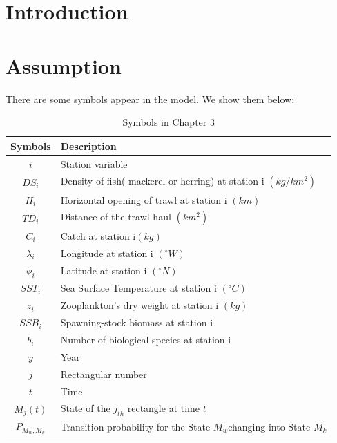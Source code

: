 \documentclass{mcmthesis}
\begin{document}
\tableofcontents


\section{Introduction}




\section{Assumption}

There are some symbols appear in the model. We show them below:
\begin{table}[htbp]
\centering
\caption{Symbols in Chapter 3}
\begin{tabular}{cp{}}
\toprule
 Symbols & Description\\
\midrule
 $i$ & Station variable \\
 $DS_i$ & Density of fish( mackerel or herring) at station i $(kg/km^2)$\\
 $H_i$ & Horizontal opening of trawl at station i  $(km)$\\
 $TD_i$ & Distance of the trawl haul $(km^2)$ \\
 $C_i$ &  Catch at station i$(kg)$\\

  $\lambda_i$ &   Longitude at station i $(^\circ W)$\\
 $\phi_i$ &   Latitude at station i $(^\circ N)$\\
$SST_i$ &  Sea Surface Temperature at station i $(^\circ C)$\\

 $z_i$ & Zooplankton's dry weight at station i $(kg)$\\
 $SSB_i$ &  Spawning-stock biomass at station i \\
  $b_i$ & Number of biological species at station i\\
$y$ & Year \\
$j$& Rectangular number\\
$t$ & Time  \\
$M_j(t)$ & State of the $j_{th}$ rectangle at time $t$ \\
$P_{M_w,M_k}$ &  Transition probability for the State $M_w$changing into State $M_k$\\
\bottomrule
\end{tabular}
\end{table}
\end{document}
